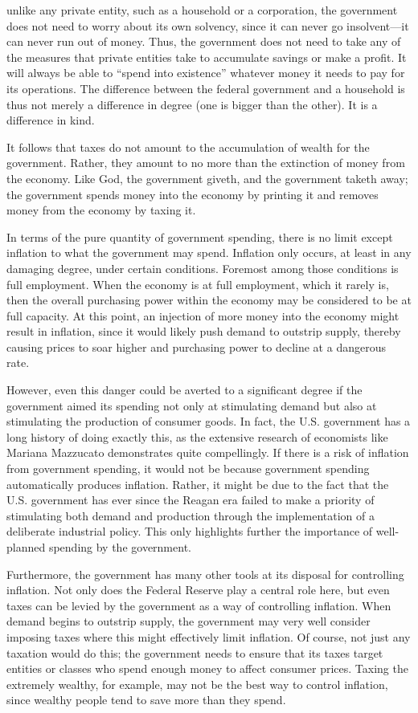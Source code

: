 \documentclass[
]{book}
\begin{document}
unlike any private entity, such as a household or a corporation, the government does not need to worry about its own solvency, since it can never go insolvent---it can never run out of money. Thus, the government does not need to take any of the measures that private entities take to accumulate savings or make a profit. It will always be able to ``spend into existence'' whatever money it needs to pay for its operations. The difference between the federal government and a household is thus not merely a difference in degree (one is bigger than the other). It is a difference in kind.

It follows that taxes do not amount to the accumulation of wealth for the government. Rather, they amount to no more than the extinction of money from the economy. Like God, the government giveth, and the government taketh away; the government spends money into the economy by printing it and removes money from the economy by taxing it.

In terms of the pure quantity of government spending, there is no limit except inflation to what the government may spend. Inflation only occurs, at least in any damaging degree, under certain conditions. Foremost among those conditions is full employment. When the economy is at full employment, which it rarely is, then the overall purchasing power within the economy may be considered to be at full capacity. At this point, an injection of more money into the economy might result in inflation, since it would likely push demand to outstrip supply, thereby causing prices to soar higher and purchasing power to decline at a dangerous rate.

However, even this danger could be averted to a significant degree if the government aimed its spending not only at stimulating demand but also at stimulating the production of consumer goods. In fact, the U.S. government has a long history of doing exactly this, as the extensive research of economists like Mariana Mazzucato demonstrates quite compellingly. If there is a risk of inflation from government spending, it would not be because government spending automatically produces inflation. Rather, it might be due to the fact that the U.S. government has ever since the Reagan era failed to make a priority of stimulating both demand and production through the implementation of a deliberate industrial policy. This only highlights further the importance of well-planned spending by the government.

Furthermore, the government has many other tools at its disposal for controlling inflation. Not only does the Federal Reserve play a central role here, but even taxes can be levied by the government as a way of controlling inflation. When demand begins to outstrip supply, the government may very well consider imposing taxes where this might effectively limit inflation. Of course, not just any taxation would do this; the government needs to ensure that its taxes target entities or classes who spend enough money to affect consumer prices. Taxing the extremely wealthy, for example, may not be the best way to control inflation, since wealthy people tend to save more than they spend.
\end{document}
